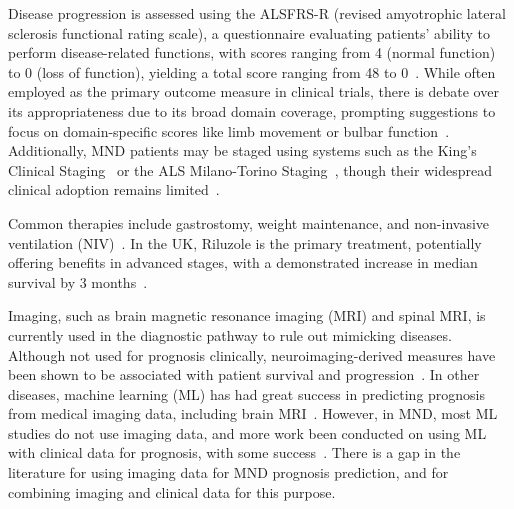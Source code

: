 Disease progression is assessed using the ALSFRS-R (revised amyotrophic lateral sclerosis functional rating scale), a questionnaire evaluating patients' ability to perform disease-related functions, with scores ranging from 4 (normal function) to 0 (loss of function), yielding a total score ranging from 48 to 0~\cite{cedarbaumALSFRSRRevisedALS1999}.
While often employed as the primary outcome measure in clinical trials, there is debate over its appropriateness due to its broad domain coverage, prompting suggestions to focus on domain-specific scores like limb movement or bulbar function~\cite{vaneijkOldFriendWho2021, rooneyWhatDoesALSFRSR2017}.
Additionally, MND patients may be staged using systems such as the King's Clinical Staging~\cite{rocheProposedStagingSystem2012} or the ALS Milano-Torino Staging~\cite{chioDevelopmentEvaluationClinical2015}, though their widespread clinical adoption remains limited~\cite{feldmanAmyotrophicLateralSclerosis2022, fangComparisonKingMiToS2017}.

Common therapies include gastrostomy, weight maintenance, and non-invasive ventilation (NIV)~\cite{bourkeEffectsNoninvasiveVentilation2006}.
In the UK, Riluzole is the primary treatment, potentially offering benefits in advanced stages, with a demonstrated increase in median survival by 3 months~\cite{millerRiluzoleAmyotrophicLateral2012, hinchcliffeRiluzoleRealworldEvidence2017}.


Imaging, such as brain magnetic resonance imaging (MRI) and spinal MRI, is currently used in the diagnostic pathway to rule out mimicking diseases.
Although not used for prognosis clinically, neuroimaging-derived measures have been shown to be associated with patient survival and progression~\cite{mullerLargescaleMulticentreCerebral2016,agostaMRIPredictorsLongterm2010}.
In other diseases, machine learning (ML) has had great success in predicting prognosis from medical imaging data, including brain MRI~\cite{gerratyMachineLearningParkinson2023}.
However, in MND, most ML studies do not use imaging data, and more work been conducted on using ML with clinical data for prognosis, with some success~\cite{grollemundMachineLearningAmyotrophic2019, papaizMachineLearningSolutions2022}.
There is a gap in the literature for using imaging data for MND prognosis prediction, and for combining imaging and clinical data for this purpose.

